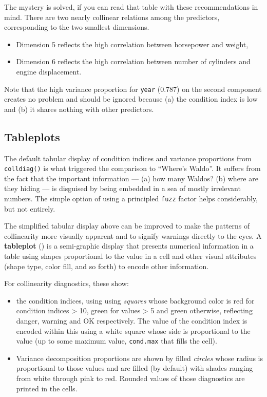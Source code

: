 \documentclass[
  letterpaper,
  10pt,
  krantz2]{krantz}
\providecommand{\tightlist}{%
  \setlength{\itemsep}{0pt}\setlength{\parskip}{0pt}}\usepackage{longtable,booktabs,array}
\begin{document}
The mystery is solved, if you can read that table with these
recommendations in mind. There are two nearly collinear relations among
the predictors, corresponding to the two smallest dimensions.

\begin{itemize}
\tightlist
\item
  Dimension 5 reflects the high correlation between horsepower and
  weight,
\item
  Dimension 6 reflects the high correlation between number of cylinders
  and engine displacement.
\end{itemize}

Note that the high variance proportion for \texttt{year} (0.787) on the
second component creates no problem and should be ignored because (a)
the condition index is low and (b) it shares nothing with other
predictors.

\subsection{Tableplots}\label{tableplots}

The default tabular display of condition indices and variance
proportions from \texttt{colldiag()} is what triggered the comparison to
``Where's Waldo''. It suffers from the fact that the important
information --- (a) how many Waldos? (b) where are they hiding --- is
disguised by being embedded in a sea of mostly irrelevant numbers. The
simple option of using a principled \texttt{fuzz} factor helps
considerably, but not entirely.

The simplified tabular display above can be improved to make the
patterns of collinearity more visually apparent and to signify warnings
directly to the eyes. A \textbf{tableplot}
() is a semi-graphic
display that presents numerical information in a table using shapes
proportional to the value in a cell and other visual attributes (shape
type, color fill, and so forth) to encode other information.

For collinearity diagnostics, these show:

\begin{itemize}
\item
  the condition indices, using using \emph{squares} whose background
  color is red for condition indices \textgreater{} 10, green for values
  \textgreater{} 5 and green otherwise, reflecting danger, warning and
  OK respectively. The value of the condition index is encoded within
  this using a white square whose side is proportional to the value (up
  to some maximum value, \texttt{cond.max} that fills the cell).
\item
  Variance decomposition proportions are shown by filled \emph{circles}
  whose radius is proportional to those values and are filled (by
  default) with shades ranging from white through pink to red. Rounded
  values of those diagnostics are printed in the cells.
\end{itemize}
\end{document}
